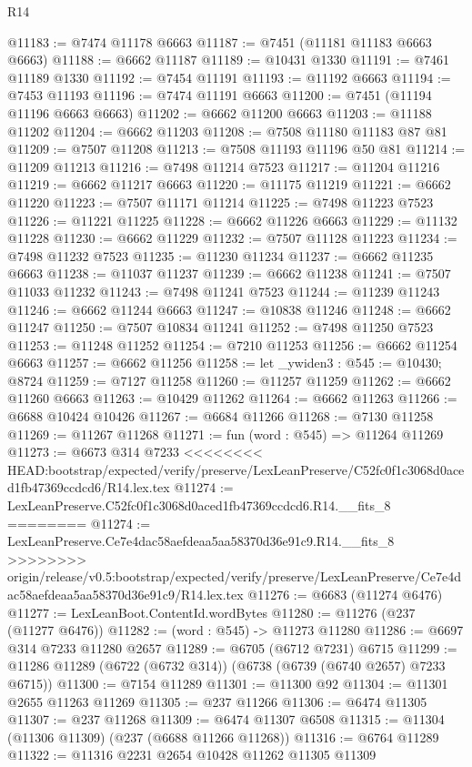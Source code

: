 \begin{lexlean}{R14}
\begin{coremodule}
{{{{{{{{{{{{{{{{{{{{{{{{{{{{{{{{{{{{{{{{{{{{{{{{{{{{{{{{{{{{{{{{{{{{{{{{{{{{{{{{{{@11183 := @7474 @11178 @6663
@11187 := @7451 (@11181 @11183 @6663 @6663)
@11188 := @6662 @11187
@11189 := @10431 @1330
@11191 := @7461 @11189 @1330
@11192 := @7454 @11191
@11193 := @11192 @6663
@11194 := @7453 @11193
@11196 := @7474 @11191 @6663
@11200 := @7451 (@11194 @11196 @6663 @6663)
@11202 := @6662 @11200 @6663
@11203 := @11188 @11202
@11204 := @6662 @11203
@11208 := @7508 @11180 @11183 @87 @81
@11209 := @7507 @11208
@11213 := @7508 @11193 @11196 @50 @81
@11214 := @11209 @11213
@11216 := @7498 @11214 @7523
@11217 := @11204 @11216
@11219 := @6662 @11217 @6663
@11220 := @11175 @11219
@11221 := @6662 @11220
@11223 := @7507 @11171 @11214
@11225 := @7498 @11223 @7523
@11226 := @11221 @11225
@11228 := @6662 @11226 @6663
@11229 := @11132 @11228
@11230 := @6662 @11229
@11232 := @7507 @11128 @11223
@11234 := @7498 @11232 @7523
@11235 := @11230 @11234
@11237 := @6662 @11235 @6663
@11238 := @11037 @11237
@11239 := @6662 @11238
@11241 := @7507 @11033 @11232
@11243 := @7498 @11241 @7523
@11244 := @11239 @11243
@11246 := @6662 @11244 @6663
@11247 := @10838 @11246
@11248 := @6662 @11247
@11250 := @7507 @10834 @11241
@11252 := @7498 @11250 @7523
@11253 := @11248 @11252
@11254 := @7210 @11253
@11256 := @6662 @11254 @6663
@11257 := @6662 @11256
@11258 := let _ywiden3 : @545 := @10430; @8724
@11259 := @7127 @11258
@11260 := @11257 @11259
@11262 := @6662 @11260 @6663
@11263 := @10429 @11262
@11264 := @6662 @11263
@11266 := @6688 @10424 @10426
@11267 := @6684 @11266
@11268 := @7130 @11258
@11269 := @11267 @11268
@11271 := fun (word : @545) => @11264 @11269
@11273 := @6673 @314 @7233
<<<<<<<< HEAD:bootstrap/expected/verify/preserve/LexLeanPreserve/C52fc0f1c3068d0aced1fb47369ccdcd6/R14.lex.tex
@11274 := LexLeanPreserve.C52fc0f1c3068d0aced1fb47369ccdcd6.R14.__fits_8
========
@11274 := LexLeanPreserve.Ce7e4dac58aefdeaa5aa58370d36e91c9.R14.__fits_8
>>>>>>>> origin/release/v0.5:bootstrap/expected/verify/preserve/LexLeanPreserve/Ce7e4dac58aefdeaa5aa58370d36e91c9/R14.lex.tex
@11276 := @6683 (@11274 @6476)
@11277 := LexLeanBoot.ContentId.wordBytes
@11280 := @11276 (@237 (@11277 @6476))
@11282 := (word : @545) -> @11273 @11280
@11286 := @6697 @314 @7233 @11280 @2657
@11289 := @6705 (@6712 @7231) @6715
@11299 := @11286 @11289 (@6722 (@6732 @314)) (@6738 (@6739 (@6740 @2657) @7233 @6715))
@11300 := @7154 @11289
@11301 := @11300 @92
@11304 := @11301 @2655 @11263 @11269
@11305 := @237 @11266
@11306 := @6474 @11305
@11307 := @237 @11268
@11309 := @6474 @11307 @6508
@11315 := @11304 (@11306 @11309) (@237 (@6688 @11266 @11268))
@11316 := @6764 @11289
@11322 := @11316 @2231 @2654 @10428 @11262 @11305 @11309
}}}}}}}}}}}}}}}}}}}}}}}}}}}}}}}}}}}}}}}}}}}}}}}}}}}}}}}}}}}}}}}}}}}}}}}}}}}}}}}}}}
\end{coremodule}
\end{lexlean}
